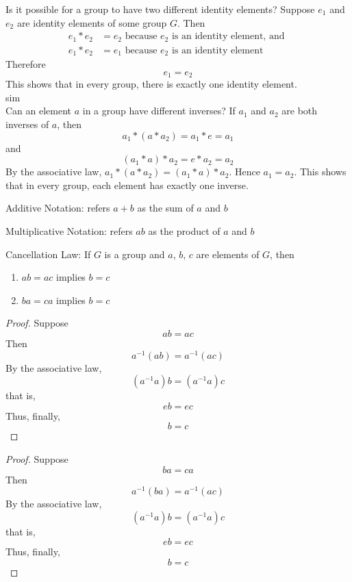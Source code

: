 \documentclass[12pt]{article}
\renewcommand{\times}{\ast}
\newcommand{\inverse}[1]{#1 ^{-1}}
\begin{document}
Is it possible for a group to have two different identity elements? Suppose $e_1$ and $e_2$ are identity elements of some group $G$. Then $$\begin{aligned} e_1 \times e_2 &= e_2 \text{ because } e_2 \text{ is an identity element, and } \\ e_1 \times e_2 &= e_1 \text{ because } e_2 \text{ is an identity element} \end{aligned} $$ 
Therefore $$e_1 = e_2$$ This shows that in every group, there is exactly one identity element. \\sim\\

Can an element $a$ in a group have different inverses? If $a_1$ and $a_2$ are both inverses of $a$, then 
$$ a_1 \times (a \times a_2) = a_1 \times e = a_1$$ and $$(a_1 \times a) \times a_2 = e \times a_2 = a_2 $$
By the associative law, $a_1 \times (a \times a_2) = (a_1 \times a) \times a_2$. Hence $a_1 = a_2$. This shows that in every group, each element has exactly one inverse. 

\begin{definition} Additive Notation: refers $a + b$ as the sum of $a$ and $b$ \end{definition} 

\begin{definition} Multiplicative Notation: refers $ab$ as the product of $a$ and $b$ \end{definition} 

\begin{theorem} Cancellation Law: If $G$ is a group and $a$, $b$, $c$ are elements of $G$, then 
\begin{enumerate} 
\item $ab = ac$ implies $b = c$
\item $ba = ca$ implies $b = c$ \end{enumerate} \end{theorem} 

\begin{proof} Suppose $$ab = ac$$ Then $$\inverse{a}(ab) = \inverse{a}(ac) $$ 
By the associative law, $$(\inverse{a}a)b = (\inverse{a}a)c$$ 
that is, $$eb = ec$$ Thus, finally, $$b = c$$ \end{proof} 

\begin{proof} Suppose $$ba = ca$$ Then $$\inverse{a}(ba) = \inverse{a}(ac) $$
By the associative law, $$(\inverse{a}a)b = (\inverse{a}a)c$$ 
that is, $$eb = ec$$ Thus, finally, $$b = c$$ \end{proof} 
\end{document}
